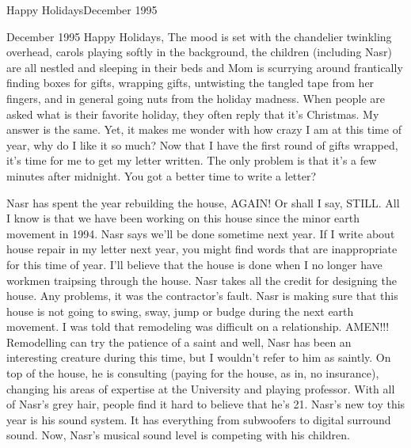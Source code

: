 
%

Happy Holidays\hfill December 1995

December 1995 Happy Holidays, The mood is set with the chandelier twinkling overhead, carols playing softly in the background, the children
(including Nasr) are all nestled and sleeping in their beds and Mom is scurrying around frantically finding boxes for gifts, wrapping gifts,
untwisting the tangled tape from her fingers, and in general going nuts from the holiday madness. When people are asked what is their favorite
holiday, they often reply that it's Christmas. My answer is the same. Yet, it makes me wonder with how crazy I am at this time of year, why do I
like it so much?  Now that I have the first round of gifts wrapped, it's time for me to get my letter written. The only problem is that it's a
few minutes after midnight. You got a better time to write a letter?


Nasr has spent the year rebuilding the house, AGAIN! Or shall I say, STILL. All I know is that we have been working on this house since the
minor earth movement in 1994. Nasr says we'll be done sometime next year. If I write about house repair in my letter next year, you might find
words that are inappropriate for this time of year. I'll believe that the house is done when I no longer have workmen traipsing through the
house. Nasr takes all the credit for designing the house. Any problems, it was the contractor's fault. Nasr is making sure that this house is
not going to swing, sway, jump or budge during the next earth movement. I was told that remodeling was difficult on a relationship. AMEN!!!
Remodelling can try the patience of a saint and well, Nasr has been an interesting creature during this time, but I wouldn't refer to him as
saintly. On top of the house, he is consulting (paying for the house, as in, no insurance), changing his areas of expertise at the University
and playing professor.   With all of Nasr's grey hair, people find it hard to believe that he's 21. Nasr's new toy this year is his sound
system. It has everything from subwoofers to digital surround sound. Now, Nasr's musical sound level is competing with his children.


